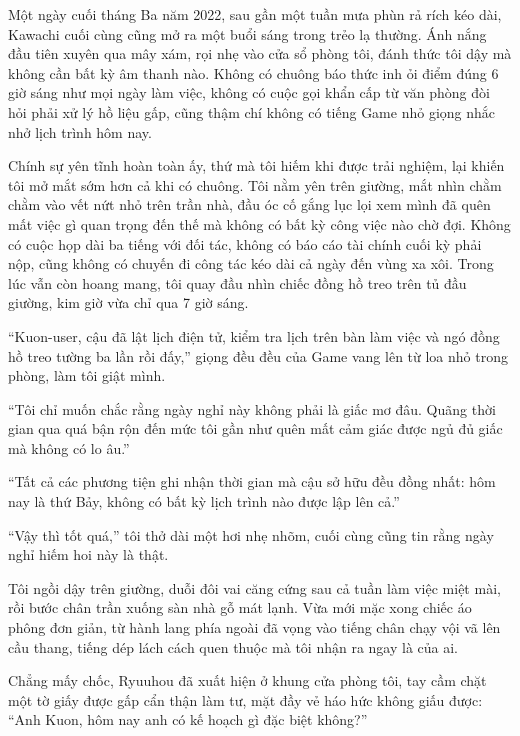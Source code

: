 ﻿\documentclass[../main.tex]{subfiles}
\begin{document}


Một ngày cuối tháng Ba năm 2022, sau gần một tuần mưa phùn rả rích kéo dài, Kawachi cuối cùng cũng mở ra một buổi sáng trong trẻo lạ thường. Ánh nắng đầu tiên xuyên qua mây xám, rọi nhẹ vào cửa sổ phòng tôi, đánh thức tôi dậy mà không cần bất kỳ âm thanh nào. Không có chuông báo thức inh ỏi điểm đúng 6 giờ sáng như mọi ngày làm việc, không có cuộc gọi khẩn cấp từ văn phòng đòi hỏi phải xử lý hồ liệu gấp, cũng thậm chí không có tiếng Game nhỏ giọng nhắc nhở lịch trình hôm nay.

Chính sự yên tĩnh hoàn toàn ấy, thứ mà tôi hiếm khi được trải nghiệm, lại khiến tôi mở mắt sớm hơn cả khi có chuông. Tôi nằm yên trên giường, mắt nhìn chằm chằm vào vết nứt nhỏ trên trần nhà, đầu óc cố gắng lục lọi xem mình đã quên mất việc gì quan trọng đến thế mà không có bất kỳ công việc nào chờ đợi. Không có cuộc họp dài ba tiếng với đối tác, không có báo cáo tài chính cuối kỳ phải nộp, cũng không có chuyến đi công tác kéo dài cả ngày đến vùng xa xôi. Trong lúc vẫn còn hoang mang, tôi quay đầu nhìn chiếc đồng hồ treo trên tủ đầu giường, kim giờ vừa chỉ qua 7 giờ sáng.

``Kuon-user, cậu đã lật lịch điện tử, kiểm tra lịch trên bàn làm việc và ngó đồng hồ treo tường ba lần rồi đấy,'' giọng đều đều của Game vang lên từ loa nhỏ trong phòng, làm tôi giật mình.

``Tôi chỉ muốn chắc rằng ngày nghỉ này không phải là giấc mơ đâu. Quãng thời gian qua quá bận rộn đến mức tôi gần như quên mất cảm giác được ngủ đủ giấc mà không có lo âu.''

``Tất cả các phương tiện ghi nhận thời gian mà cậu sở hữu đều đồng nhất: hôm nay là thứ Bảy, không có bất kỳ lịch trình nào được lập lên cả.''

``Vậy thì tốt quá,'' tôi thở dài một hơi nhẹ nhõm, cuối cùng cũng tin rằng ngày nghỉ hiếm hoi này là thật.

Tôi ngồi dậy trên giường, duỗi đôi vai căng cứng sau cả tuần làm việc miệt mài, rồi bước chân trần xuống sàn nhà gỗ mát lạnh. Vừa mới mặc xong chiếc áo phông đơn giản, từ hành lang phía ngoài đã vọng vào tiếng chân chạy vội vã lên cầu thang, tiếng dép lách cách quen thuộc mà tôi nhận ra ngay là của ai.

Chẳng mấy chốc, Ryuuhou đã xuất hiện ở khung cửa phòng tôi, tay cầm chặt một tờ giấy được gấp cẩn thận làm tư, mặt đầy vẻ háo hức không giấu được: ``Anh Kuon, hôm nay anh có kế hoạch gì đặc biệt không?''
\end{document}
